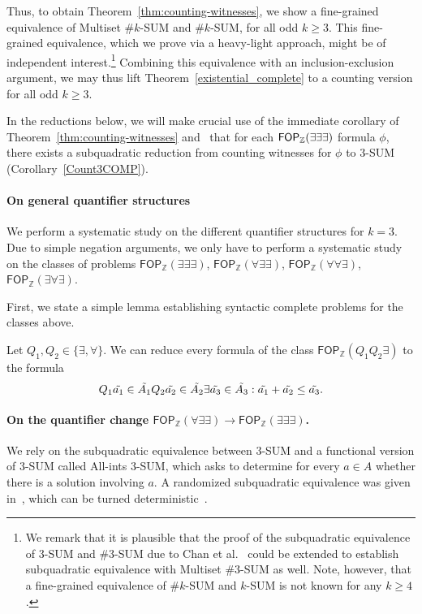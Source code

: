 Thus, to obtain Theorem~\ref{thm:counting-witnesses}, we show a fine-grained equivalence of Multiset \#$k$-SUM and \#$k$-SUM, for all odd $k\ge 3$. This fine-grained equivalence, which we prove via a heavy-light approach, might be of independent interest.\footnote{We remark that it is plausible that the proof of the subquadratic equivalence of $3$-SUM and \#$3$-SUM due to Chan et al.~\cite{DBLP:journals/corr/abs-2303-14572} could be extended to establish subquadratic equivalence with Multiset \#$3$-SUM as well. Note, however, that a fine-grained equivalence of \#$k$-SUM and $k$-SUM is not known for any $k\ge 4$.}
Combining this equivalence with an inclusion-exclusion argument, we may thus lift Theorem~\ref{existential_complete} to a counting version for all odd $k \ge 3$.

In the reductions below, we will make crucial use of the immediate corollary of Theorem~\ref{thm:counting-witnesses} and~\cite{DBLP:journals/corr/abs-2303-14572} that for each $\mathsf{FOP}_{\mathbb{Z}}(\exists \exists \exists)$ formula $\phi$, there exists a subquadratic reduction from counting witnesses for $\phi$ to $3$-SUM (Corollary~\ref{Count3COMP}).




\paragraph*{On general quantifier structures}
We perform a systematic study on the different quantifier structures for $k=3$. 
Due to simple negation arguments, we only have to perform a systematic study on the classes of problems
$\mathsf{FOP}_{\mathbb{Z}}(\exists \exists \exists)$,
$\mathsf{FOP}_{\mathbb{Z}}(\forall \exists \exists)$,
$\mathsf{FOP}_{\mathbb{Z}}(\forall \forall \exists)$,
$\mathsf{FOP}_{\mathbb{Z}}(\exists \forall \exists)$.

First, we state a simple lemma establishing syntactic complete problems for the classes above.
\begin{lemma}
Let $Q_1,Q_2 \in \{\exists,\forall\}$. We can reduce every formula of the class $\mathsf{FOP}_{\mathbb{Z}}(Q_1Q_2\exists)$ to the formula  
$$Q_1 \Tilde{a_1} \in \Tilde{A_1} Q_2 \Tilde{a_2}  \in \Tilde{A_2} \exists \Tilde{a_3}  \in \Tilde{A_3}: \Tilde{a_1} +\Tilde{a_2}  \leq \Tilde{a_3}.  $$
\end{lemma}

\paragraph*{On the quantifier change $\mathsf{FOP}_{\mathbb{Z}}(\forall \exists \exists) \to \mathsf{FOP}_{\mathbb{Z}}(\exists \exists \exists) $.}
We rely on the subquadratic equivalence between $3$-SUM and a functional version of $3$-SUM called All-ints $3$-SUM, which asks to determine 
for every $a \in A$  whether there is a solution involving $a$. A randomized subquadratic equivalence was given in~\cite{DBLP:conf/focs/WilliamsW10}, which can be turned deterministic~\cite{DBLP:conf/icalp/LincolnWWW16}.

